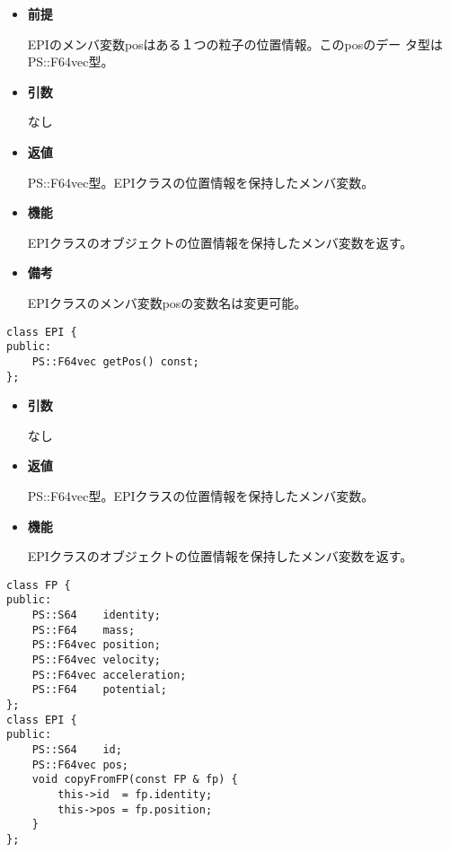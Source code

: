 \begin{itemize}

\item {\bf 前提}
  
  EPIのメンバ変数posはある１つの粒子の位置情報。このposのデー
  タ型はPS::F64vec型。
  
\item {\bf 引数}

  なし
  
\item {\bf 返値}

  PS::F64vec型。EPIクラスの位置情報を保持したメンバ変数。
  
\item {\bf 機能}

  EPIクラスのオブジェクトの位置情報を保持したメンバ変数を返す。
  
\item {\bf 備考}

  EPIクラスのメンバ変数posの変数名は変更可能。

\end{itemize}
\fi

\begin{screen}
\begin{verbatim}
class EPI {
public:
    PS::F64vec getPos() const;
};
\end{verbatim}
\end{screen}

\begin{itemize}

\item {\bf 引数}

  なし
  
\item {\bf 返値}

  PS::F64vec型。EPIクラスの位置情報を保持したメンバ変数。
  
\item {\bf 機能}

  EPIクラスのオブジェクトの位置情報を保持したメンバ変数を返す。
  
\end{itemize}



\begin{screen}
\begin{verbatim}
class FP {
public:
    PS::S64    identity;
    PS::F64    mass;
    PS::F64vec position;
    PS::F64vec velocity;
    PS::F64vec acceleration;
    PS::F64    potential;
};
class EPI {
public:
    PS::S64    id;
    PS::F64vec pos;
    void copyFromFP(const FP & fp) {
        this->id  = fp.identity;
        this->pos = fp.position;
    }
};
\end{verbatim}
\end{screen}

